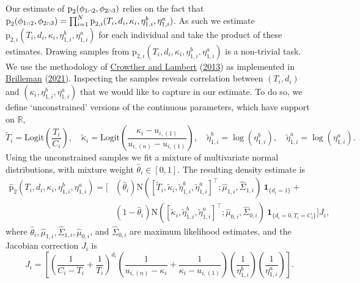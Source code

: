 \documentclass[
  10pt,
  a4paper,
]{article}
\let\Oldcap\cap
\renewcommand{\cap}{\mathrel{\mathsmaller{\Oldcap}}}
\newcommand{\pd}{\text{p}}
\begin{document}
Our estimate of \(\pd_{2}(\phi_{1 \cap 2}, \phi_{2 \cap 3})\) relies on
the fact that
\(\pd_{2}(\phi_{1 \cap 2}, \phi_{2 \cap 3}) = \prod_{i = 1}^{N}\pd_{2, i}(T_{i}, d_{i}, \kappa_{i}, \eta^{b}_{1, i}, \eta^{a}_{1, i})\).
As such we estimate
\(\pd_{2, i}(T_{i}, d_{i}, \kappa_{i}, \eta^{b}_{1, i}, \eta^{a}_{1, i})\)
for each individual and take the product of these estimates. Drawing
samples from
\(\pd_{2, i}(T_{i}, d_{i}, \kappa_{i}, \eta^{b}_{1, i}, \eta^{a}_{1, i})\)
is a non-trivial task. We use the methodology of
\protect\hyperlink{ref-crowther_simulating_2013}{Crowther and Lambert}
(\protect\hyperlink{ref-crowther_simulating_2013}{2013}) as implemented
in \protect\hyperlink{ref-brilleman_simulate_2021}{Brilleman}
(\protect\hyperlink{ref-brilleman_simulate_2021}{2021}). Inspecting the
samples reveals correlation between \((T_{i}, d_{i})\) and
\((\kappa_{i}, \eta^{b}_{1, i}, \eta^{a}_{1, i})\) that we would like to
capture in our estimate. To do so, we define `unconstrained' versions of
the continuous parameters, which have support on \(\mathbb{R}\),
\begin{equation}
  \tilde{T}_{i} = \text{Logit}\left(\frac{T_{i}}{C_{i}}\right), \quad
  \tilde{\kappa}_{i} = \text{Logit}\left(\frac{\kappa_{i} - u_{i, (1)}}{u_{i, (n)} - u_{i, (1)}}\right), \quad
  \tilde{\eta}^{b}_{1, i} = \log(\eta^{b}_{1, i}), \quad
  \tilde{\eta}^{a}_{1, i} = \log(\eta^{a}_{1, i}).
\end{equation} Using the unconstrained samples we fit a mixture of
multivariate normal distributions, with mixture weight
\(\widehat{\theta}_{i} \in [0, 1]\). The resulting density estimate is
\begin{align*}
  \widehat{\pd}_{2}(T_{i}, d_{i}, \kappa_{i}, \eta^{b}_{1, i}, \eta^{a}_{1, i}) =
    \Big[&(\widehat{\theta}_{i})
    \text{N}\left(\left[\tilde{T}_{i}, \tilde{\kappa}_{i}, \tilde{\eta}^{b}_{1, i}, \tilde{\eta}^{a}_{1, i} \right]^{\top}; \widehat{\mu}_{1, i}, \widehat{\Sigma}_{1, i} \right) \
    \boldsymbol{1}_{\{d_{i} = 1\}}
    + \\
    &(1 - \widehat{\theta}_{i})
    \text{N}\left(\left[\tilde{\kappa}_{i}, \tilde{\eta}^{b}_{1, i}, \tilde{\eta}^{a}_{1, i} \right]^{\top}; \widehat{\mu}_{0, i}, \widehat{\Sigma}_{0, i} \right) \
    \boldsymbol{1}_{\{d_{i} = 0, T_{i} = C_{i}\}} \Big]
    J_{i},
\end{align*} where
\(\widehat{\theta}_{i}, \widehat{\mu}_{1, i}, \widehat{\Sigma}_{1, i}, \widehat{\mu}_{0, i}\),
and \(\widehat{\Sigma}_{0, i}\) are maximum likelihood estimates, and
the Jacobian correction \(J_{i}\) is \begin{equation}
  J_{i} = \left[
    \left(
      \frac{1}{C_{i} - T_{i}} +
      \frac{1}{T_{i}}
    \right)^{d_{i}}
    \left(
      \frac{1}{u_{i, (n)} - \kappa_{i}} +
      \frac{1}{\kappa_{i} - u_{i, (1)}}
    \right)
    \left(
      \frac{1}{\eta^{b}_{1, i}}
    \right)
    \left(
      \frac{1}{\eta^{a}_{1, i}}
    \right)
  \right].
\end{equation}
\end{document}
